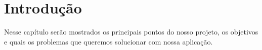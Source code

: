 
\chapter[Introdução]{Introdução}
Nesse capítulo serão mostrados os principais pontos do nosso projeto, os objetivos e quais os problemas que queremos solucionar com nossa aplicação.










